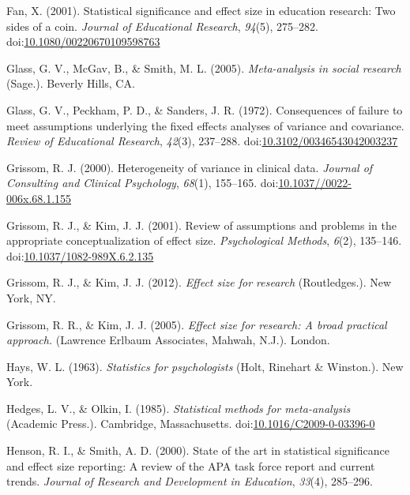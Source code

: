 \documentclass[
  man,floatsintext]{apa6}
\begin{document}
\leavevmode\hypertarget{ref-Fan_2001}{}%
Fan, X. (2001). Statistical significance and effect size in education research: Two sides of a coin. \emph{Journal of Educational Research}, \emph{94}(5), 275--282. doi:\href{https://doi.org/10.1080/00220670109598763}{10.1080/00220670109598763}

\leavevmode\hypertarget{ref-Glass_et_al_1981}{}%
Glass, G. V., McGav, B., \& Smith, M. L. (2005). \emph{Meta-analysis in social research} (Sage.). Beverly Hills, CA.

\leavevmode\hypertarget{ref-Glass_et_al_1972}{}%
Glass, G. V., Peckham, P. D., \& Sanders, J. R. (1972). Consequences of failure to meet assumptions underlying the fixed effects analyses of variance and covariance. \emph{Review of Educational Research}, \emph{42}(3), 237--288. doi:\href{https://doi.org/10.3102/00346543042003237}{10.3102/00346543042003237}

\leavevmode\hypertarget{ref-Grissom_2000}{}%
Grissom, R. J. (2000). Heterogeneity of variance in clinical data. \emph{Journal of Consulting and Clinical Psychology}, \emph{68}(1), 155--165. doi:\href{https://doi.org/10.1037//0022-006x.68.1.155}{10.1037//0022-006x.68.1.155}

\leavevmode\hypertarget{ref-Grissom_Kim_2001}{}%
Grissom, R. J., \& Kim, J. J. (2001). Review of assumptions and problems in the appropriate conceptualization of effect size. \emph{Psychological Methods}, \emph{6}(2), 135--146. doi:\href{https://doi.org/10.1037/1082-989X.6.2.135}{10.1037/1082-989X.6.2.135}

\leavevmode\hypertarget{ref-Grissom_and_Kim_2012}{}%
Grissom, R. J., \& Kim, J. J. (2012). \emph{Effect size for research} (Routledges.). New York, NY.

\leavevmode\hypertarget{ref-Grissom_and_kim_2005}{}%
Grissom, R. R., \& Kim, J. J. (2005). \emph{Effect size for research: A broad practical approach.} (Lawrence Erlbaum Associates, Mahwah, N.J.). London.

\leavevmode\hypertarget{ref-Hays_1963}{}%
Hays, W. L. (1963). \emph{Statistics for psychologists} (Holt, Rinehart \& Winston.). New York.

\leavevmode\hypertarget{ref-Hedges_Olkin_1985}{}%
Hedges, L. V., \& Olkin, I. (1985). \emph{Statistical methods for meta-analysis} (Academic Press.). Cambridge, Massachusetts. doi:\href{https://doi.org/10.1016/C2009-0-03396-0}{10.1016/C2009-0-03396-0}

\leavevmode\hypertarget{ref-Henson_Smith_2000}{}%
Henson, R. I., \& Smith, A. D. (2000). State of the art in statistical significance and effect size reporting: A review of the APA task force report and current trends. \emph{Journal of Research and Development in Education}, \emph{33}(4), 285--296.
\end{document}
